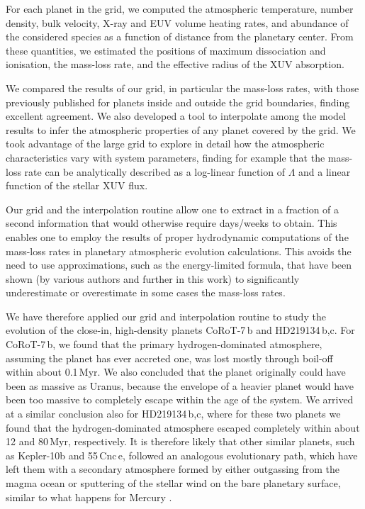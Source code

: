 \documentclass{aa}
\begin{document}
For each planet in the grid, we computed the atmospheric temperature, number density, bulk velocity, X-ray and EUV volume heating rates, and abundance of the considered species as a function of distance from the planetary center. From these quantities, we estimated the positions of maximum dissociation and ionisation, the mass-loss rate, and the effective radius of the XUV absorption.

We compared the results of our grid, in particular the mass-loss rates, with those previously published for planets inside and outside the grid boundaries, finding excellent agreement. We also developed a tool to interpolate among the model results to infer the atmospheric properties of any planet covered by the grid. We took advantage of the large grid to explore in detail how the atmospheric characteristics vary with system parameters, finding for example that the mass-loss rate can be analytically described as a log-linear function of $\Lambda$ and a linear function of the stellar XUV flux.

Our grid and the interpolation routine allow one to extract in a
fraction of a second information that would otherwise require
days/weeks to obtain. This enables one to employ the results of
proper hydrodynamic computations of the mass-loss rates in
planetary atmospheric evolution calculations. This avoids the need
to use approximations, such as the energy-limited formula, that
have been shown (by various authors and further in this work) {to
significantly underestimate or overestimate in some cases} the
mass-loss rates.

We have therefore applied our grid and interpolation routine to study the evolution of the close-in, high-density planets CoRoT-7\,b and HD219134\,b,c. For CoRoT-7\,b, we found that the primary hydrogen-dominated atmosphere, assuming the planet has ever accreted one, was lost mostly through boil-off within about 0.1\,Myr. We also concluded that the planet originally could have been as massive as Uranus, because the envelope of a heavier planet would have been too massive to completely escape within the age of the system. We arrived at a similar conclusion also for HD219134\,b,c, where for these two planets we found that the hydrogen-dominated atmosphere escaped completely within about 12
and 80\,Myr, respectively. It is therefore likely that other similar planets, such as Kepler-10b and 55\,Cnc\,e, followed an analogous evolutionary path, which have left them with a secondary atmosphere formed by either outgassing from the magma ocean or sputtering of the stellar wind on the bare planetary surface, similar to what happens for Mercury \citep{mura2011,guenther2011,pfleger2015,vidotto2018}.
\end{document}
